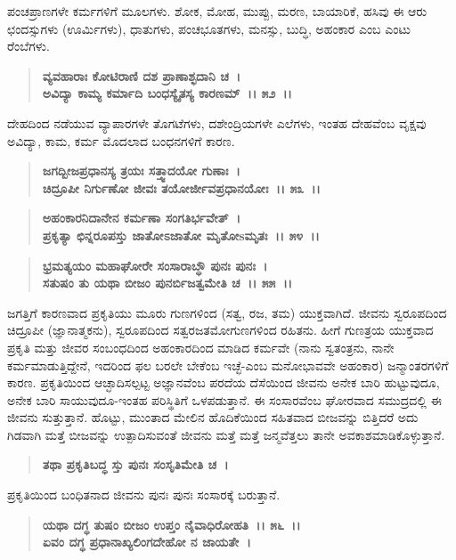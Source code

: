 ಪಂಚಪ್ರಾಣಗಳೇ ಕರ್ಮಗಳಿಗೆ ಮೂಲಗಳು. ಶೋಕ, ಮೋಹ, ಮುಪ್ಪು, ಮರಣ, ಬಾಯಾರಿಕೆ, ಹಸಿವು ಈ ಆರು ಛಂದಸ್ಸುಗಳು (ಊರ್ಮಿಗಳು), ಧಾತುಗಳು, ಪಂಚಭೂತಗಳು, ಮನಸ್ಸು, ಬುದ್ಧಿ, ಅಹಂಕಾರ ಎಂಬ ಎಂಟು ರೆಂಬೆಗಳು.

\begin{verse}
\textbf{ವ್ಯವಹಾರಾಃ ಕೋಟಿರಾಣಿ ದಶ ಪ್ರಾಣಾಶ್ಛದಾನಿ ಚ~।}\\\textbf{ಅವಿದ್ಯಾ ಕಾಮ್ಯ ಕರ್ಮಾದಿ ಬಂಧಸ್ಯೈತಸ್ಯ ಕಾರಣಮ್~।। ೫೨~।।}
\end{verse}

ದೇಹದಿಂದ ನಡೆಯುವ ವ್ಯಾಪಾರಗಳೇ ತೊಗಟೆಗಳು, ದಶೇಂದ್ರಿಯಗಳೇ ಎಲೆಗಳು, ಇಂತಹ ದೇಹವೆಂಬ ವೃಕ್ಷವು ಅವಿದ್ಯಾ, ಕಾಮ, ಕರ್ಮ ಮೊದಲಾದ ಬಂಧನಗಳಿಗೆ ಕಾರಣ.

\begin{verse}
\textbf{ಜಗದ್ಬೀಜಪ್ರಧಾನಸ್ಯ ತ್ರಯಃ ಸತ್ತ್ವಾದಯೋ ಗುಣಾಃ~।}\\\textbf{ಚಿದ್ರೂಪೀ ನಿರ್ಗುಣೋ ಜೀವಃ ತಯೋರ್ಜೀವಪ್ರಧಾನಯೋಃ~।। ೫೩~।। }
\end{verse}

\begin{verse}
\textbf{ಅಹಂಕಾರನಿದಾನೇನ ಕರ್ಮಣಾ ಸಂಗತಿರ್ಭವೇತ್~।}\\\textbf{ಪ್ರಕೃತ್ಯಾ ಛಿನ್ನರೂಪಸ್ತು ಜಾತೋಽಜಾತೋ ಮೃತೋsಮೃತಃ~।। ೫೪~।। }
\end{verse}

\begin{verse}
\textbf{ಭ್ರಮತ್ಯಯಂ ಮಹಾಘೋರೇ ಸಂಸಾರಾಬ್ಧೌ ಪುನಃ ಪುನಃ~।}\\\textbf{ಸತುಷಂ ತು ಯಥಾ ಬೀಜಂ ಪುನರ್ಬಿಜತ್ವಮೇತಿ ಚ~।। ೫೫~।।}
\end{verse}

ಜಗತ್ತಿಗೆ ಕಾರಣವಾದ ಪ್ರಕೃತಿಯು ಮೂರು ಗುಣಗಳಿಂದ (ಸತ್ವ, ರಜ, ತಮ) ಯುಕ್ತವಾಗಿದೆ. ಜೀವನು ಸ್ವರೂಪದಿಂದ ಚಿದ್ರೂಪೀ (ಜ್ಞಾನಾತ್ಮಕನು), ಸ್ವರೂಪದಿಂದ ಸತ್ವರಜತಮೋಗುಣಗಳಿಂದ ರಹಿತನು. ಹೀಗೆ ಗುಣತ್ರಯ ಯುಕ್ತವಾದ ಪ್ರಕೃತಿ ಮತ್ತು ಜೀವರ ಸಂಬಂಧದಿಂದ ಅಹಂಕಾರದಿಂದ ಮಾಡಿದ ಕರ್ಮವೇ (ನಾನು ಸ್ವತಂತ್ರನು, ನಾನೇ ಕರ್ಮಮಾಡುತ್ತಿದ್ದೇನೆ, ಇದರಿಂದ ಫಲ ಬರಲೇ ಬೇಕೆಂಬ ಇಚ್ಛೆ-ಎಂಬ ಮನೋಭಾವವೇ ಅಹಂಕಾರ) ಜನ್ಮಾಂತರಗಳಿಗೆ ಕಾರಣ. ಪ್ರಕೃತಿಯಿಂದ ಆಚ್ಛಾದಿಸಲ್ಪಟ್ಟ ಅಜ್ಞಾನವೆಂಬ ಪರದೆಯ ದೆಸೆಯಿಂದ ಜೀವನು ಅನೇಕ ಬಾರಿ ಹುಟ್ಟುವುದೂ, ಅನೇಕ ಬಾರಿ ಸಾಯು\-ವುದೂ-ಇಂತಹ ಪರಿಸ್ಥಿತಿಗೆ ಒಳಪಡುತ್ತಾನೆ. ಈ ಸಂಸಾರವೆಂಬ ಘೋರವಾದ ಸಮುದ್ರದಲ್ಲಿ ಈ ಜೀವನು ಸುತ್ತುತ್ತಾನೆ. ಹೊಟ್ಟು, ಮುಂತಾದ ಮೇಲಿನ ಹೊದಿಕೆಯಿಂದ ಸಹಿತವಾದ ಬೀಜವನ್ನು ಬಿತ್ತಿದರೆ ಅದು ಗಿಡವಾಗಿ ಮತ್ತೆ ಬೀಜವನ್ನು ಉತ್ಪಾದಿಸುವಂತೆ ಜೀವನು ಮತ್ತೆ ಮತ್ತೆ ಜನ್ಮವೆತ್ತಲು ತಾನೇ ಅವಕಾಶಮಾಡಿಕೊಳ್ಳುತ್ತಾನೆ.

\begin{verse}
\textbf{ತಥಾ ಪ್ರಕೃತಿಬದ್ಧ ಸ್ತು ಪುನಃ ಸಂಸೃತಿಮೇತಿ ಚ~।}
\end{verse}

ಪ್ರಕೃತಿಯಿಂದ ಬಂಧಿತನಾದ ಜೀವನು ಪುನಃ ಪುನಃ ಸಂಸಾರಕ್ಕೆ ಬರುತ್ತಾನೆ.

\begin{verse}
\textbf{ಯಥಾ ದಗ್ಧ ತುಷಂ ಬೀಜಂ ಉಪ್ತಂ ನೈವಾಧಿರೋಹತಿ~।। ೫೬~।।}\\\textbf{ಏವಂ ದಗ್ಧ ಪ್ರಧಾನಾಖ್ಯಲಿಂಗದೇಹೋ ನ ಜಾಯತೇ~।}
\end{verse}

